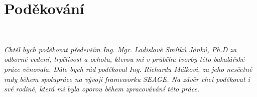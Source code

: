 \documentclass[a4paper,czech,unicode,twoside]{book}[2019/12/20]
\makeatletter
\newcommand{\frontchapternotprinted}[1]{%
  \begingroup
  \let\@makechapterhead\@gobble %
  \let\cleardoublepage\clearpage
  \chapter{#1}
  \endgroup
}
\theoremstyle{plain}
\theoremstyle{definition}
\theoremstyle{remark}
\numberwithin{theorem}{chapter}
\makeatother
\begin{document}
\tableofcontents
\listoffigures
\begingroup
\let\clearpage\relax
\listoftables
\lstlistoflistings
\endgroup

\frontchapternotprinted{Poděkování}
~
\vfill
\hskip 0cm \begin{minipage}{0.7\textwidth}
\textit{Chtěl bych poděkovat především Ing. Mgr. Ladislavě Smítků Jánků, Ph.D za odborné vedení, trpělivost a ochotu, kterou mi v průběhu tvorby této bakalářské práce věnovala. Dále bych rád poděkoval Ing. Richardu Málkovi, za jeho nesčetné rady během spolupráce na vývoji frameworku SEAGE. Na závěr chci poděkovat i své rodině, která mi byla oporou během zpracovávání této práce.}
\end{minipage}

\vfill

\vfill
\end{document}
